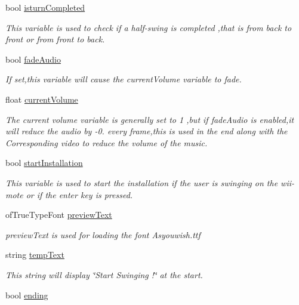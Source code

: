 \begin{DoxyCompactItemize}
bool \hyperlink{classtest_app_a42478a80a90ce9f663c04bcdaea5c5bd}{isturn\-Completed}
\begin{DoxyCompactList}\small\item\em This variable is used to check if a half-\/swing is completed ,that is from back to front or from front to back. \end{DoxyCompactList}\item 
bool \hyperlink{classtest_app_a918c09b5a4389a8402cfacb25d390226}{fade\-Audio}
\begin{DoxyCompactList}\small\item\em If set,this variable will cause the current\-Volume variable to fade. \end{DoxyCompactList}\item 
float \hyperlink{classtest_app_a51c20c5432d9f6b06f719526d9a34ee6}{current\-Volume}
\begin{DoxyCompactList}\small\item\em The current volume variable is generally set to 1 ,but if fade\-Audio is enabled,it will reduce the audio by -\/0. every frame,this is used in the end along with the Corresponding video to reduce the volume of the music. \end{DoxyCompactList}\item 
bool \hyperlink{classtest_app_a8a65a6d1a473417cec1c2ac2e6116aae}{start\-Installation}
\begin{DoxyCompactList}\small\item\em This variable is used to start the installation if the user is swinging on the wii-\/mote or if the enter key is pressed. \end{DoxyCompactList}\item 
of\-True\-Type\-Font \hyperlink{classtest_app_af5b1af55af2256ef3751de075fc7a9cc}{preview\-Text}
\begin{DoxyCompactList}\small\item\em preview\-Text is used for loading the font Asyouwish.\-ttf \end{DoxyCompactList}\item 
string \hyperlink{classtest_app_ad9a4beab6f2e0f13d32b00b502e89bdc}{temp\-Text}
\begin{DoxyCompactList}\small\item\em This string will display \char`\"{}\-Start Swinging !\char`\"{} at the start. \end{DoxyCompactList}\item 
bool \hyperlink{classtest_app_acf09303bc452d2a38098f6bf94655408}{ending}

\end{DoxyCompactItemize}
